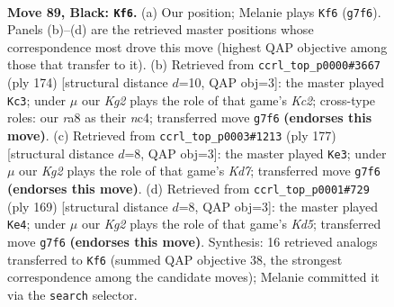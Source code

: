 \documentclass[11pt]{article}
\begin{document}
\clearpage

\begin{figure}[p]\centering
\begin{subfigure}{0.46\textwidth}\centering
\resizebox{\linewidth}{!}{%
\newchessgame
\chessboard[
  setfen={R7/3b2k1/8/5p2/5P2/3r4/7K/8 b - - 2 89},
  showmover=false,
  pgfstyle=straightmove, color=movearrow, markmove={g7-f6}
]}
\caption{}
\end{subfigure}\hfill
\begin{subfigure}{0.46\textwidth}\centering
\resizebox{\linewidth}{!}{%
\newchessgame
\chessboard[
  setfen={8/8/k7/8/2n5/7p/2K4P/6B1 w - - 6 88},
  showmover=false,
  pgfstyle=straightmove, color=movearrow, markmove={c2-c3}
]}
\caption{}
\end{subfigure}
\\[4pt]
\begin{subfigure}{0.46\textwidth}\centering
\resizebox{\linewidth}{!}{%
\newchessgame
\chessboard[
  setfen={8/8/8/3K4/8/p7/Pb1k4/7R b - - 49 89},
  showmover=false,
  pgfstyle=straightmove, color=movearrow, markmove={d2-e3}
]}
\caption{}
\end{subfigure}\hfill
\begin{subfigure}{0.46\textwidth}\centering
\resizebox{\linewidth}{!}{%
\newchessgame
\chessboard[
  setfen={8/4K3/2R5/7p/3k2bP/8/8/8 b - - 26 85},
  showmover=false,
  pgfstyle=straightmove, color=movearrow, markmove={d4-e4}
]}
\caption{}
\end{subfigure}
\caption{\textbf{Move 89, Black: \texttt{Kf6}.} (a) Our position; Melanie plays \texttt{Kf6} (\texttt{g7f6}). Panels (b)--(d) are the retrieved master positions whose correspondence most drove this move (highest QAP objective among those that transfer to it). (b) Retrieved from \texttt{ccrl\_top\_p0000\#3667} (ply 174) [structural distance $d$=10, QAP obj=3]: the master played \texttt{Kc3}; under $\mu$ our \emph{Kg2} plays the role of that game's \emph{Kc2}; cross-type roles: our \emph{r}a8 as their \emph{n}c4; transferred move \texttt{g7f6} \textbf{(endorses this move)}. (c) Retrieved from \texttt{ccrl\_top\_p0003\#1213} (ply 177) [structural distance $d$=8, QAP obj=3]: the master played \texttt{Ke3}; under $\mu$ our \emph{Kg2} plays the role of that game's \emph{Kd7}; transferred move \texttt{g7f6} \textbf{(endorses this move)}. (d) Retrieved from \texttt{ccrl\_top\_p0001\#729} (ply 169) [structural distance $d$=8, QAP obj=3]: the master played \texttt{Ke4}; under $\mu$ our \emph{Kg2} plays the role of that game's \emph{Kd5}; transferred move \texttt{g7f6} \textbf{(endorses this move)}. Synthesis: 16 retrieved analogs transferred to \texttt{Kf6} (summed QAP objective 38, the strongest correspondence among the candidate moves); Melanie committed it via the \texttt{search} selector.}
\label{fig:thought-m177}
\end{figure}
\end{document}
